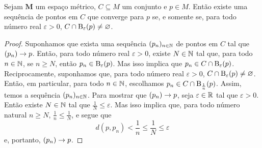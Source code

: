\begin{prop}
Sejam $\bm M$ um espaço métrico, $C \subseteq M$ um conjunto e $p \in M$. Então existe uma sequência de pontos em $C$ que converge para $p$ se, e somente se, para todo número real $\varepsilon > 0$, $C \cap \mathrm{B}_\varepsilon(p) \neq \varnothing$.
\end{prop}
\begin{proof}
	Suponhamos que exista uma sequência $(p_n)_{n \in \mathbb{N}}$ de pontos em $C$ tal que $(p_n) \rightarrow p$. Então, para todo número real $\varepsilon > 0$, existe $N \in \mathbb{N}$ tal que, para todo $n \in \mathbb{N}$, se $n \geq N$, então $p_n \in \mathrm{B}_\varepsilon(p)$. Mas isso implica que $p_n \in C \cap \mathrm{B}_\varepsilon(p)$. Reciprocamente, suponhamos que, para todo número real $\varepsilon > 0$, $C \cap \mathrm{B}_\varepsilon(p) \neq \varnothing$. Então, em particular, para todo $n \in \mathbb{N}$, escolhamos $p_n \in C \cap \mathrm{B}_{\frac{1}{n}}(p)$. Assim, temos a sequência $(p_n)_{n \in \mathbb{N}}$. Para mostrar que $(p_n) \rightarrow p$, seja $\varepsilon \in \mathbb{R}$ tal que $\varepsilon > 0$. Então existe $N \in \mathbb{N}$ tal que $\frac{1}{N} \leq \varepsilon$. Mas isso implica que, para todo número natural $n \geq N$, $\frac{1}{n} \leq \frac{1}{N}$, e segue que
	\begin{equation*}
	d(p,p_n) < \frac{1}{n} \leq \frac{1}{N} \leq \varepsilon
	\end{equation*}
e, portanto, $(p_n) \rightarrow p$.
\end{proof}

